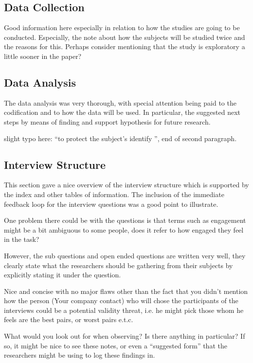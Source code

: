 \documentclass[times, 10pt,twocolumn]{article}
\begin{document}
\subsection*{Data Collection}
Good information here especially in relation to how the studies are going to be conducted. Especially, the note about how the subjects will be studied twice and the reasons for this. Perhaps consider mentioning that the study is exploratory a little sooner in the paper?

\subsection*{Data Analysis}
The data analysis was very thorough, with special attention being paid to the codification and to how the data will be used. In particular, the suggested next steps by means of finding and support hypothesis for future research.

slight typo here: ``to protect the subject’s identify '', end of second paragraph.

\subsection*{Interview Structure}
This section gave a nice overview of the interview structure which is supported by the index and other tables of information. The inclusion of the immediate feedback loop for the interview questions was a good point to illustrate.

One problem there could be with the questions is that terms such as engagement might be a bit ambiguous to some people, does it refer to how engaged they feel in the task? 

However, the sub questions and open ended questions are written very well, they clearly state what the researchers should be gathering from their subjects by explicitly stating it under the question.

Nice and concise with no major flaws other than the fact that you didn't mention how the person (Your company contact) who will chose the participants of the interviews could be a potential validity threat, i.e. he might pick those whom he feels are the best pairs, or worst pairs e.t.c.

What would you look out for when observing? Is there anything in particular? If so, it might be nice to see these notes, or even a ``suggested form'' that the researchers might be using to log these findings in.
\end{document}
